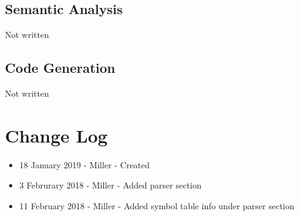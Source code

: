 \documentclass[english]{article}
\begin{document}
\subsection{Semantic Analysis}

Not written

\subsection{Code Generation}

Not written



\par\addvspace{1cm}%
\section{Change Log}

\begin{itemize}
\item
18 January 2019 - Miller - Created
\item
3 Februrary 2018 - Miller - Added parser section
\item
11 February 2018 - Miller - Added symbol table info under parser section

\end{itemize}
\end{document}
